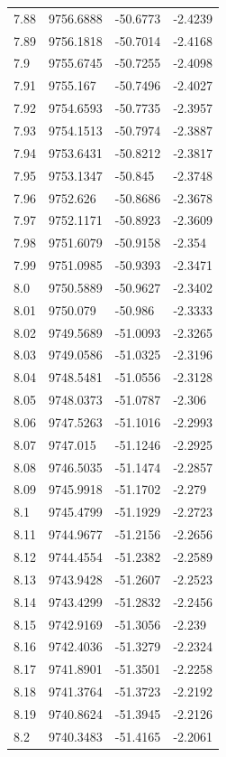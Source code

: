 \begin{table}[H]
\begin{tabular}{llll}
7.88 & 9756.6888 & -50.6773 & -2.4239 \\
7.89 & 9756.1818 & -50.7014 & -2.4168 \\
7.9 & 9755.6745 & -50.7255 & -2.4098 \\
7.91 & 9755.167 & -50.7496 & -2.4027 \\
7.92 & 9754.6593 & -50.7735 & -2.3957 \\
7.93 & 9754.1513 & -50.7974 & -2.3887 \\
7.94 & 9753.6431 & -50.8212 & -2.3817 \\
7.95 & 9753.1347 & -50.845 & -2.3748 \\
7.96 & 9752.626 & -50.8686 & -2.3678 \\
7.97 & 9752.1171 & -50.8923 & -2.3609 \\
7.98 & 9751.6079 & -50.9158 & -2.354 \\
7.99 & 9751.0985 & -50.9393 & -2.3471 \\
8.0 & 9750.5889 & -50.9627 & -2.3402 \\
8.01 & 9750.079 & -50.986 & -2.3333 \\
8.02 & 9749.5689 & -51.0093 & -2.3265 \\
8.03 & 9749.0586 & -51.0325 & -2.3196 \\
8.04 & 9748.5481 & -51.0556 & -2.3128 \\
8.05 & 9748.0373 & -51.0787 & -2.306 \\
8.06 & 9747.5263 & -51.1016 & -2.2993 \\
8.07 & 9747.015 & -51.1246 & -2.2925 \\
8.08 & 9746.5035 & -51.1474 & -2.2857 \\
8.09 & 9745.9918 & -51.1702 & -2.279 \\
8.1 & 9745.4799 & -51.1929 & -2.2723 \\
8.11 & 9744.9677 & -51.2156 & -2.2656 \\
8.12 & 9744.4554 & -51.2382 & -2.2589 \\
8.13 & 9743.9428 & -51.2607 & -2.2523 \\
8.14 & 9743.4299 & -51.2832 & -2.2456 \\
8.15 & 9742.9169 & -51.3056 & -2.239 \\
8.16 & 9742.4036 & -51.3279 & -2.2324 \\
8.17 & 9741.8901 & -51.3501 & -2.2258 \\
8.18 & 9741.3764 & -51.3723 & -2.2192 \\
8.19 & 9740.8624 & -51.3945 & -2.2126 \\
8.2 & 9740.3483 & -51.4165 & -2.2061 \\

\end{tabular}
\end{table}
